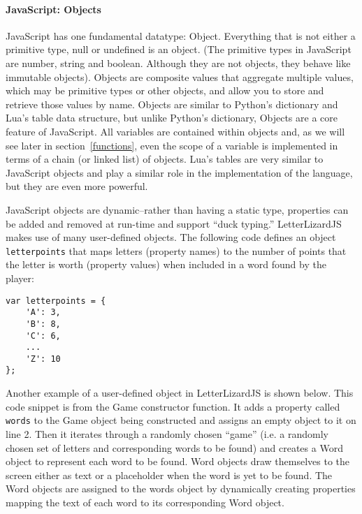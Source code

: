 
\paragraph{JavaScript: Objects}

JavaScript has one fundamental datatype: Object. Everything that is not either a
primitive type, null or undefined is an object. (The primitive types in JavaScript are
number, string and boolean. Although they are not objects, they behave like immutable
objects). Objects are composite values that aggregate multiple values, which may be
primitive types or other objects, and allow you to store and retrieve those values
by name. Objects are similar to Python's dictionary and Lua's table data structure, but
unlike Python's dictionary, Objects are a core feature of JavaScript. All variables are
contained within objects and, as we will see later in section~\ref{functions}, even
the scope of a variable is implemented in terms of a chain (or linked list) of objects.
Lua's tables are very similar to JavaScript objects and play a similar role in the
implementation of the language, but they are even more powerful.

JavaScript objects are dynamic--rather than having a static type, properties can be added
and removed at run-time and support ``duck typing.'' LetterLizardJS makes use of many
user-defined objects. The following code defines an object \texttt{letterpoints} that
maps letters (property names) to the number of points that the letter is worth
(property values) when included in a word found by the player:

\begin{lstlisting}[caption=A user-defined object in JavaScript]
var letterpoints = {
	'A': 3,
	'B': 8,
	'C': 6,
	...
	'Z': 10
};
\end{lstlisting}

Another example of a user-defined object in LetterLizardJS is shown below. This code
snippet is from the Game constructor function. It adds a property called 
\texttt{words} to the Game object being constructed and assigns an empty object
to it on line 2. Then it iterates through a randomly chosen ``game'' (i.e. a
randomly chosen set of letters and corresponding words to be found) and creates
a Word object to represent each word to be found. Word objects draw themselves to the
screen either as text or a placeholder when the word is yet to be found. The Word
objects are assigned to the words object by dynamically creating properties mapping
the text of each word to its corresponding Word object.


